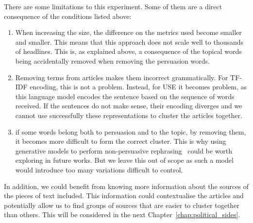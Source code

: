 
There are some limitations to this experiment. Some of them are a direct consequence of the conditions listed above:

\begin{enumerate}
    \item When increasing the size, the difference on the metrics used become smaller and smaller. This means that this approach does not scale well to thousands of headlines. This is, as explained above, a consequence of the topical words being accidentally removed when removing the persuasion words.
    \item Removing terms from articles makes them incorrect grammatically. For TF-IDF encoding, this is not a problem. Instead, for USE it becomes problem, as this language model encodes the sentence based on the sequence of words received. If the sentences do not make sense, their encoding diverges and we cannot use successfully these representations to cluster the articles together.
    \item if some words belong both to persuasion and to the topic, by removing them, it becomes more difficult to form the correct cluster.
    This is why using generative models to perform non-persuasive rephrasing~\cite{bagdasaryan2022spinning} could be worth exploring in future works. But we leave this out of scope as such a model would introduce too many variations difficult to control. %
\end{enumerate}

In addition, we could benefit from knowing more information about the sources of the pieces of text included. This information could contextualise the articles and potentially allow us to find groups of sources that are easier to cluster together than others. This will be considered in the next Chapter~\ref{chap:political_sides}.

